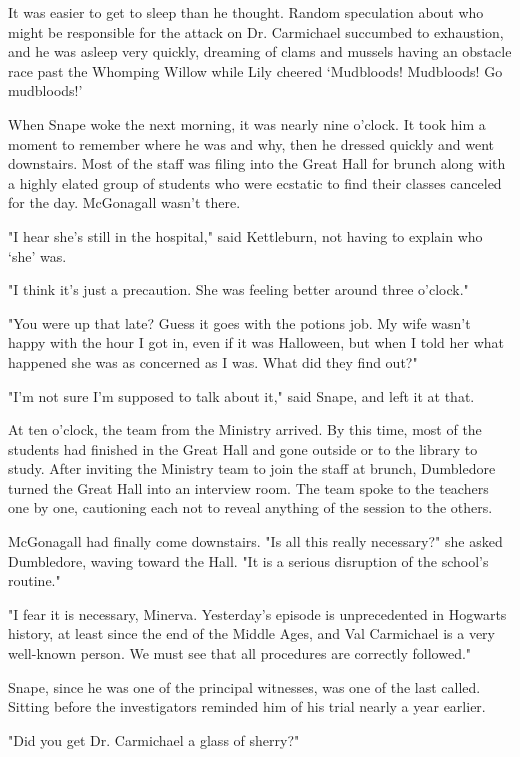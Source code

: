 It was easier to get to sleep than he thought. Random speculation about who might be responsible for the attack on Dr. Carmichael succumbed to exhaustion, and he was asleep very quickly, dreaming of clams and mussels having an obstacle race past the Whomping Willow while Lily cheered `Mudbloods! Mudbloods! Go{\el} mudbloods!'

When Snape woke the next morning, it was nearly nine o'clock. It took him a moment to remember where he was and why, then he dressed quickly and went downstairs. Most of the staff was filing into the Great Hall for brunch along with a highly elated group of students who were ecstatic to find their classes canceled for the day. McGonagall wasn't there.

"I hear she's still in the hospital," said Kettleburn, not having to explain who `she' was.

"I think it's just a precaution. She was feeling better around three o'clock."

"You were up that late? Guess it goes with the potions job. My wife wasn't happy with the hour I got in, even if it was Halloween, but when I told her what happened she was as concerned as I was. What did they find out?"

"I'm not sure I'm supposed to talk about it," said Snape, and left it at that.

At ten o'clock, the team from the Ministry arrived. By this time, most of the students had finished in the Great Hall and gone outside or to the library to study. After inviting the Ministry team to join the staff at brunch, Dumbledore turned the Great Hall into an interview room. The team spoke to the teachers one by one, cautioning each not to reveal anything of the session to the others.

McGonagall had finally come downstairs. "Is all this really necessary?" she asked Dumbledore, waving toward the Hall. "It is a serious disruption of the school's routine."

"I fear it is necessary, Minerva. Yesterday's episode is unprecedented in Hogwarts history, at least since the end of the Middle Ages, and Val Carmichael is a very well-known person. We must see that all procedures are correctly followed."

Snape, since he was one of the principal witnesses, was one of the last called. Sitting before the investigators reminded him of his trial nearly a year earlier.

"Did you get Dr. Carmichael a glass of sherry?"

